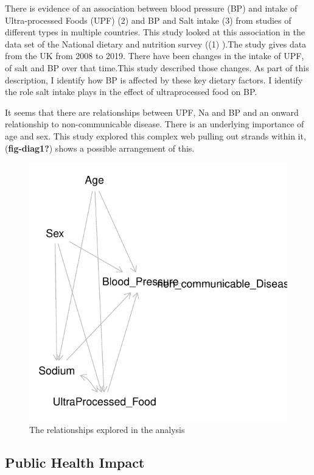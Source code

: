\documentclass[
]{article}
\begin{document}
There is evidence of an association between blood pressure (BP) and
intake of Ultra-processed Foods (UPF) (2) and BP and Salt intake (3)
from studies of different types in multiple countries. This study looked
at this association in the data set of the National dietary and
nutrition survey ((1) ).The study gives data from the UK from 2008 to
2019. There have been changes in the intake of UPF, of salt and BP over
that time.This study described those changes. As part of this
description, I identify how BP is affected by these key dietary factors.
I identify the role salt intake plays in the effect of ultraprocessed
food on BP.

It seems that there are relationships between UPF, Na and BP and an
onward relationship to non-communicable disease. There is an underlying
importance of age and sex. This study explored this complex web pulling
out strands within it, (\textbf{fig-diag1?}) shows a possible
arrangement of this.

\begin{figure}
\centering
\includegraphics{nextlevel_files/figure-latex/fig-diag1-1.pdf}
\caption{The relationships explored in the analysis}
\end{figure}

\hypertarget{public-health-impact}{%
\subsection{Public Health Impact}\label{public-health-impact}}
\end{document}
